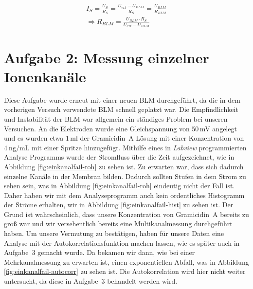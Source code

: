 \documentclass[a4paper,ngerman]{scrartcl}
\begin{document}
\begin{eqnarray}
    I_S = \frac{U_S}{R_S} = \frac{U_{ext}-U_{BLM}}{R_S} = \frac{U_{BLM}}{R_{BLM}}\\
    \Rightarrow R_{BLM} = \frac{U_{BLM} \cdot R_S}{U_{ext} - U_{BLM}}
\end{eqnarray}



\clearpage
\section{Aufgabe 2: Messung einzelner Ionenkanäle}
Diese Aufgabe wurde erneut mit einer neuen BLM durchgeführt, da die in dem vorherigen Versuch verwendete BLM schnell geplatzt war.
Die Empfindlichkeit und Instabilität der BLM war allgemein ein ständiges Problem bei unseren Versuchen.
An die Elektroden wurde eine Gleichspannung von 50\,mV angelegt und es wurden etwa 1\,ml der Gramicidin~A Lösung mit einer Konzentration von $\SI{4}{\nano\gram\per\milli\liter}$ mit einer Spritze hinzugefügt. Mithilfe eines in \emph{Labview} programmierten Analyse Programms wurde 
der Stromfluss über die Zeit aufgezeichnet, wie in Abbildung \ref{fig:einkanalfail-roh} zu sehen ist.
Zu erwarten war, dass sich dadurch einzelne Kanäle in der Membran bilden. 
Dadurch sollten Stufen in dem Strom zu sehen sein, was in Abbildung \ref{fig:einkanalfail-roh} eindeutig nicht der Fall ist. 
Daher haben wir mit dem Analyseprogramm auch kein ordentliches Histogramm der Ströme erhalten, wir in Abbildung \ref{fig:einkanalfail-hist} zu sehen ist. 
Der Grund ist wahrscheinlich, dass unsere Konzentration von Gramicidin~A bereits zu groß war und wir versehentlich bereits eine Multikanalmessung durchgeführt haben. Um unsere Vermutung zu bestätigen, haben für unsere Daten eine Analyse mit der Autokorrelationsfunktion machen lassen,
wie es später auch in Aufgabe~3 gemacht wurde. 
Da bekamen wir dann, wie bei einer Mehrkanalmessung zu erwarten ist, einen exponentiellen Abfall, 
was in Abbildung \ref{fig:einkanalfail-autocorr} zu sehen ist. 
Die Autokorrelation wird hier nicht weiter untersucht, da diese in Aufgabe~3 behandelt werden wird.\\
\end{document}
